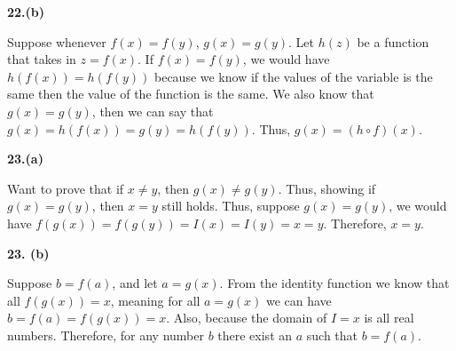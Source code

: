 \documentclass[a4paper,12pt]{report}
\begin{document}
\noindent
\textbf{22.(b)}

\noindent
Suppose whenever $f(x)=f(y)$, $g(x)=g(y)$. Let $h(z)$ be a function that takes in $z=f(x)$. If $f(x)=f(y)$, we would have $h(f(x))=h(f(y))$ because we know if the values of the variable is the same then the value of the function is the same. We also know that $g(x)=g(y)$, then we can say that $g(x)=h(f(x))=g(y)=h(f(y))$. Thus, $g(x)=(h\circ f)(x)$. 

\noindent
\textbf{23.(a)}

\noindent
Want to prove that if $x\neq y$, then $g(x)\neq g(y)$. Thus, showing if $g(x)=g(y)$, then $x=y$ still holds. Thus, suppose $g(x)=g(y)$, we would have $f(g(x))=f(g(y))=I(x)=I(y)=x=y$. Therefore, $x=y$.

\noindent
\textbf{23. (b)}

\noindent
Suppose $b=f(a)$, and let $a=g(x)$. From the identity function we know that all $f(g(x))=x$, meaning for all $a=g(x)$ we can have $b=f(a)=f(g(x))=x$. Also, because the domain of $I=x$ is all real numbers. Therefore, for any number $b$ there exist an $a$ such that $b=f(a)$.
\end{document}
